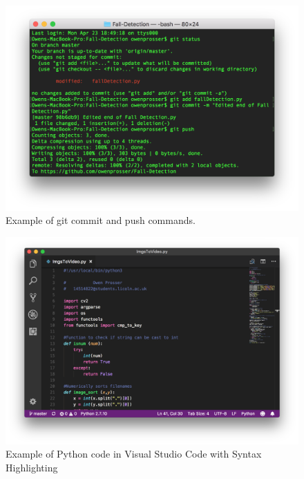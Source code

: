 \documentclass[11pt,a4paper]{report}
\begin{document}
\begin{figure}[H]
 \centering
 \includegraphics[scale = 0.55]{gitpush.png}
 \caption{Example of git commit and push commands.}
 \label{fig:GitCommitPush}
\end{figure}

\begin{figure}[H]
 \centering
 \includegraphics[scale = 0.4]{VSCode.png}
 \caption{Example of Python code in Visual Studio Code with Syntax Highlighting}
 \label{fig:VSCode}
\end{figure}
\end{document}
